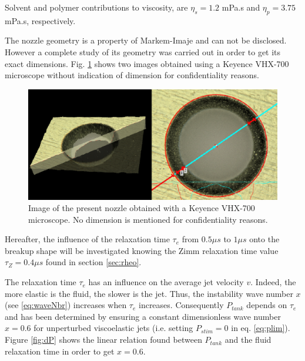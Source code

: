 \documentclass[onecolumn, 12pt]{asme2ej}
\begin{document}
Solvent and polymer contributions to viscosity, are $\eta_s = 1.2$ mPa.s and $\eta_p=3.75$mPa.s, respectively. 

 
The nozzle geometry is a property of {Markem-Imaje\textcopyright} and can not be disclosed. However a complete study of its geometry was carried out in order to get its exact dimensions. Fig. \ref{fig:micro} shows two images obtained using a Keyence VHX-700 microscope without indication of dimension for confidentiality reasons.

\begin{figure}[h]
    \centering
\includegraphics[width=12cm]{Figures/Fig11.eps}
\caption{Image of the present nozzle obtained with a Keyence VHX-700 microscope. No dimension is mentioned for confidentiality reasons.}
\label{fig:micro}
\end{figure}
 


Hereafter, the influence of the relaxation time $\tau_e$ from $0.5 \mu s$ to $1 \mu s$ onto the breakup shape will be investigated knowing the Zimm relaxation time value $\tau_Z= 0.4 \mu s$ found in section \ref{sec:rheo}.

The relaxation time $\tau_e$ has an influence on the average jet velocity $v$. Indeed, the more elastic is the fluid, the slower is the jet. Thus, the instability wave number $x$ (see \ref{eq:waveNbr}) increases when $\tau_e$ increases. Consequently $P_{tank}$ depends on $\tau_e$ and has been determined by ensuring a constant dimensionless wave number $x=0.6$ for unperturbed viscoelastic jets (i.e. setting $P_{stim}=0$ in eq. \ref{eq:plim}). Figure \ref{fig:dP} shows the linear relation found between $P_{tank}$ and the fluid relaxation time in order to get $x=0.6$.
\end{document}

